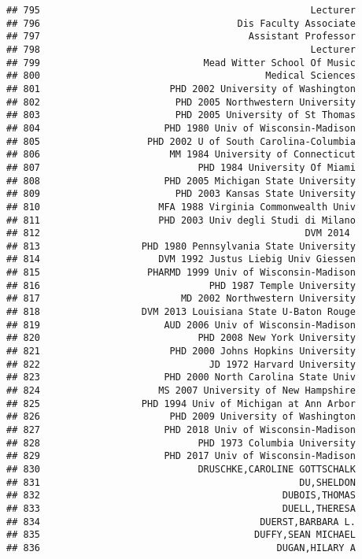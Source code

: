 \documentclass[
]{article}
\begin{document}
\begin{verbatim}
## 795                                                Lecturer
## 796                                   Dis Faculty Associate
## 797                                     Assistant Professor
## 798                                                Lecturer
## 799                             Mead Witter School Of Music
## 800                                        Medical Sciences
## 801                       PHD 2002 University of Washington
## 802                        PHD 2005 Northwestern University
## 803                        PHD 2005 University of St Thomas
## 804                      PHD 1980 Univ of Wisconsin-Madison
## 805                   PHD 2002 U of South Carolina-Columbia
## 806                       MM 1984 University of Connecticut
## 807                            PHD 1984 University Of Miami
## 808                      PHD 2005 Michigan State University
## 809                        PHD 2003 Kansas State University
## 810                     MFA 1988 Virginia Commonwealth Univ
## 811                     PHD 2003 Univ degli Studi di Milano
## 812                                               DVM 2014 
## 813                  PHD 1980 Pennsylvania State University
## 814                     DVM 1992 Justus Liebig Univ Giessen
## 815                   PHARMD 1999 Univ of Wisconsin-Madison
## 816                              PHD 1987 Temple University
## 817                         MD 2002 Northwestern University
## 818                  DVM 2013 Louisiana State U-Baton Rouge
## 819                      AUD 2006 Univ of Wisconsin-Madison
## 820                            PHD 2008 New York University
## 821                       PHD 2000 Johns Hopkins University
## 822                              JD 1972 Harvard University
## 823                      PHD 2000 North Carolina State Univ
## 824                     MS 2007 University of New Hampshire
## 825                  PHD 1994 Univ of Michigan at Ann Arbor
## 826                       PHD 2009 University of Washington
## 827                      PHD 2018 Univ of Wisconsin-Madison
## 828                            PHD 1973 Columbia University
## 829                      PHD 2017 Univ of Wisconsin-Madison
## 830                            DRUSCHKE,CAROLINE GOTTSCHALK
## 831                                              DU,SHELDON
## 832                                           DUBOIS,THOMAS
## 833                                           DUELL,THERESA
## 834                                       DUERST,BARBARA L.
## 835                                      DUFFY,SEAN MICHAEL
## 836                                          DUGAN,HILARY A

\end{verbatim}
\end{document}
